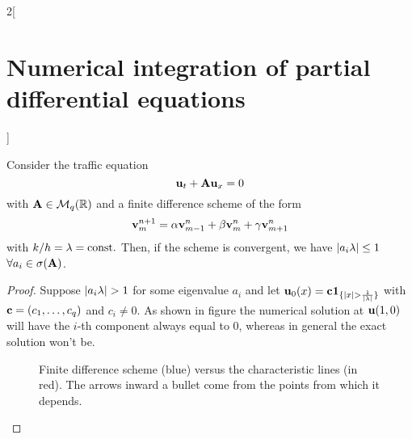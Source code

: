 \documentclass[../../../main_math.tex]{subfiles}
\begin{document}
\begin{multicols}{2}[\section{Numerical integration of partial differential equations}]
\begin{sproof}
  \end{sproof}
  \begin{theorem}
    Consider the traffic equation $$\boldsymbol{\mathrm{u}}_t+\boldsymbol{\mathrm{A}}\boldsymbol{\mathrm{u}}_x=0$$ with $\boldsymbol{\mathrm{A}}\in\mathcal{M}_q(\mathbb{R})$ and a finite difference scheme of the form $$\boldsymbol{\mathrm{v}}_m^{n+1}=\alpha \boldsymbol{\mathrm{v}}_{m-1}^n+\beta \boldsymbol{\mathrm{v}}_m^n+\gamma \boldsymbol{\mathrm{v}}_{m+1}^n$$ with $k/h=\lambda=\text{const.}$ Then, if the scheme is convergent, we have $\abs{a_i\lambda}\leq 1$ $\forall a_i\in\sigma(\boldsymbol{\mathrm{A}})$.
  \end{theorem}
  \begin{proof}
    Suppose $\abs{a_i\lambda}>1$ for some eigenvalue $a_i$ and let $\boldsymbol{\mathrm{u}}_0(x)=\boldsymbol{\mathrm{c}}\boldsymbol{\mathrm{1}}_{\{\abs{x}> \frac{1}{\abs{\lambda}}\}}$ with $\boldsymbol{\mathrm{c}}=(c_1,\ldots,c_q)$ and $c_i\ne 0$. As shown in figure  the numerical solution at $\boldsymbol{\mathrm{u}}(1,0)$ will have the $i$-th component always equal to 0, whereas in general the exact solution won't be.
    \begin{figure}[H]
      \centering
      
      \caption{Finite difference scheme (blue) versus the characteristic lines (in red). The arrows inward a bullet come from the points from which it depends.}
      \label{NIPDE:courant-friedrichs-lewy_fig}
    \end{figure}
  \end{proof}

\end{multicols}
\end{document}
